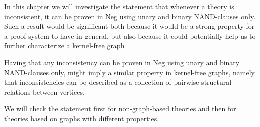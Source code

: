 In this chapter we will investigate the statement that whenever a theory is inconsistent, it can be proven in Neg using unary and binary NAND-clauses only.
Such a result would be significant both because it would be a strong property for a proof system to have in general, but also because it could potentially help us to further characterize a kernel-free graph

Having that any inconsistency can be proven in Neg using unary and binary NAND-clauses only, might imply a similar property in kernel-free graphs, namely that inconsistencies can be described as a collection of pairwise structural relations between vertices.

We will check the statement first for non-graph-based theories and then for theories based on graphs with different properties.
